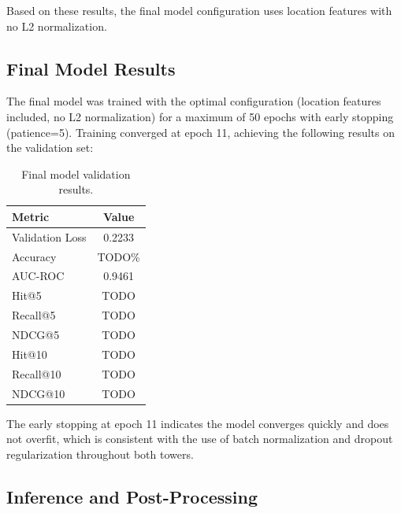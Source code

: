 Based on these results, the final model configuration uses location features with no L2 normalization.

\subsection{Final Model Results}
\label{sec:user_results}

The final model was trained with the optimal configuration (location features included, no L2 normalization) for a maximum of 50 epochs with early stopping (patience=5). Training converged at epoch 11, achieving the following results on the validation set:

\begin{table}[htbp]
    \centering
    \caption{Final model validation results.}
    \label{tab:final_results}
    \begin{tabular}{|l|c|}
        \hline
        \textbf{Metric} & \textbf{Value} \\
        \hline
        Validation Loss & 0.2233 \\
        Accuracy        & TODO\% \\
        AUC-ROC         & 0.9461 \\
        Hit@5           & TODO \\
        Recall@5        & TODO \\
        NDCG@5          & TODO \\
        Hit@10          & TODO \\
        Recall@10       & TODO \\
        NDCG@10         & TODO \\
        \hline
    \end{tabular}
\end{table}


The early stopping at epoch 11 indicates the model converges quickly and does not overfit, which is consistent with the use of batch normalization and dropout regularization throughout both towers.

\subsection{Inference and Post-Processing}
\label{sec:inference_postprocessing}

